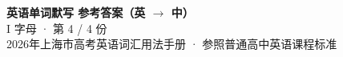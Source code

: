 \documentclass[10pt,a4paper]{article}
\begin{document}
\pagestyle{plain}

\begin{center}
{\LARGE\bfseries 英语单词默写 \quad 参考答案（英 $\to$ 中）}\\[0.22em]
{\large I 字母 · 第 4 / 4 份}\\[0.18em]
{\small 2026年上海市高考英语词汇用法手册 · 参照普通高中英语课程标准}
\end{center}

\vspace{0.2em}
\noindent{\color{rulegray}\rule{\textwidth}{0.8pt}}

\vspace{0.35em}

\vspace{0.25em}
\renewcommand{\arraystretch}{1.32}
\end{document}
